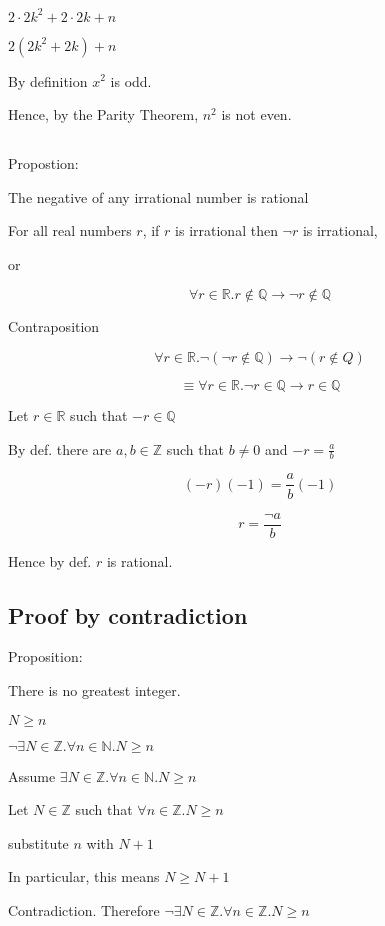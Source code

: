\documentclass[a4paper,11pt]{article}
\begin{document}
$ 2 \cdot 2k^2 + 2 \cdot 2k + n $

$ 2(2k^2 + 2k) + n $

By definition $x^2$ is odd.

Hence, by the Parity Theorem, $n^2$ is not even.

\subsection{}

Propostion:

The negative of any irrational number is rational


For all real numbers $r$, if $r$ is irrational then $\neg r$ is irrational,

or

$$\forall r \in \mathbb{R}. r \notin \mathbb{Q} \to \neg r \notin \mathbb{Q}$$

Contraposition

$$\forall r \in \mathbb{R}. \neg (\neg r \notin \mathbb{Q}) \to \neg (r \notin Q) $$


$$\equiv \forall r \in \mathbb{R}. \neg r \in \mathbb{Q} \to r \in \mathbb{Q} $$

Let $r \in \mathbb{R}$ such that $- r \in \mathbb{Q}$

By def. there are $a,b \in \mathbb{Z}$ such that $b \neq 0$ and $- r = \frac{a}{b}$

$$(-r)(- 1) = \frac{a}{b} (- 1)$$

$$r = \frac{\neg a}{b}$$

Hence by def. $r$ is rational.

\subsection{Proof by contradiction}

Proposition:

There is no greatest integer.

$N \geq n$ 


$ \neg \exists N \in \mathbb{Z}. \forall n \in \mathbb{N}. N \geq n $

Assume $\exists N \in \mathbb{Z}. \forall n \in \mathbb{N}. N \geq n$

Let $N \in \mathbb{Z}$ such that $\forall n \in \mathbb{Z}. N \geq n$

substitute $n$ with $N+1$

In particular, this means $N \geq N + 1$

Contradiction. Therefore $\neg \exists N \in \mathbb{Z}. \forall n \in \mathbb{Z}. N \geq n$
\end{document}
